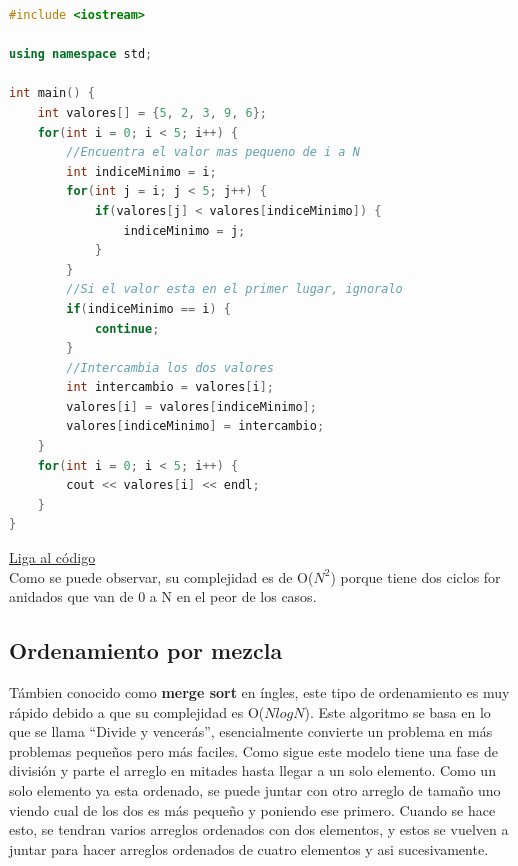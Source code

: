 \documentclass{article}
\begin{document}
\begin{lstlisting}[language=C++, title=Ordenamiento por selección]
#include <iostream>

using namespace std;

int main() {
	int valores[] = {5, 2, 3, 9, 6};
	for(int i = 0; i < 5; i++) {
		//Encuentra el valor mas pequeno de i a N
		int indiceMinimo = i;
		for(int j = i; j < 5; j++) {
			if(valores[j] < valores[indiceMinimo]) {
				indiceMinimo = j;
			}
		}
		//Si el valor esta en el primer lugar, ignoralo
		if(indiceMinimo == i) {
			continue;
		}
		//Intercambia los dos valores
		int intercambio = valores[i];
		valores[i] = valores[indiceMinimo];
		valores[indiceMinimo] = intercambio;
	}
	for(int i = 0; i < 5; i++) {
		cout << valores[i] << endl;
	}
}
\end{lstlisting}
\href{https://repl.it/@Jamesscn/Ordenamiento-de-seleccion}{Liga al código} \\

Como se puede observar, su complejidad es de O($N^2$) porque tiene dos ciclos for anidados que van de 0 a N en el peor de los casos.

\subsection{Ordenamiento por mezcla}

Támbien conocido como \textbf{merge sort} en íngles, este tipo de ordenamiento es muy rápido debido a que su complejidad es O($N log N$). Este algoritmo se basa en lo que se llama ``Divide y vencerás'', esencialmente convierte un problema en más problemas pequeños pero más faciles. Como sigue este modelo tiene una fase de división y parte el arreglo en mitades hasta llegar a un solo elemento. Como un solo elemento ya esta ordenado, se puede juntar con otro arreglo de tamaño uno viendo cual de los dos es más pequeño y poniendo ese primero. Cuando se hace esto, se tendran varios arreglos ordenados con dos elementos, y estos se vuelven a juntar para hacer arreglos ordenados de cuatro elementos y asi sucesivamente.
\end{document}
